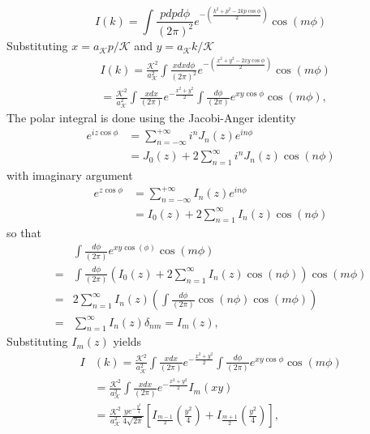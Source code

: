 \documentclass[english,aps,prd,nofootinbib,twocolumn]{revtex4-1}
\begin{document}
\begin{equation}
I(k)=\int \!\! \frac{p dp d\phi }{(2\pi)^2}
e^{-\left( 
\tfrac{k^{2}+p^{2}-2kp \cos \!\phi}{2} 
\right)}
\cos(m\phi)
\end{equation}
Substituting $x=a_{\mathcal{K}}p/\mathcal{K}$ and $y=a_{\mathcal{K}}k/\mathcal{K}$
\begin{equation}
\begin{split}
&I(k)=\frac{\mathcal{K}^{2}}{a_{\mathcal{K}}^{2}}\!\!
\int \!\! \frac{x dx d\phi }{(2\pi)^2}
e^{-\left( 
\tfrac{x^{2}+y^{2}-2xy \cos \!\phi}{2} 
\right)}
\!\! \cos(m\phi) \\ &=
\frac{\mathcal{K}^{2}}{a_{\mathcal{K}}^{2}}\!\!
\int \!\! \frac{x dx}{(2\pi)}
e^{-\tfrac{x^{2}+y^{2}}{2} } \!\!
\int \!\! \frac{d\phi }{(2\pi)}
e^{xy \cos \!\phi} 
\! \cos(m\phi)
,
\end{split}
\end{equation}
The polar integral is done using the Jacobi-Anger identity
\begin{equation}
\begin{split}
e^{iz\cos\phi} \!&= \!\!\!
\sum_{n=-\infty}^{+\infty}i^{n}J_{n}(z)e^{in\phi}
\\&= J_{0}(z) + 
2\sum_{n=1}^{\infty}i^{n}J_{n}(z)\cos(n\phi)
\end{split}
\end{equation}
with imaginary argument 
\begin{equation}
\begin{split}
e^{z\cos\phi}&=\sum_{n=-\infty}^{+\infty}I_{n}(z)e^{in\phi}
\\& = I_{0}(z) + 
2\sum_{n=1}^{\infty}I_{n}(z)\cos(n\phi)
\end{split}
\end{equation}
so that
\begin{equation}
\begin{split}
&
\int \!\! \frac{d\phi }{(2\pi)}
e^{xy \cos(\phi)} 
\! \cos(m\phi)
\\=&
\int \!\! \frac{d\phi }{(2\pi)}
\left(
I_{0}(z) + 
2\sum_{n=1}^{\infty}I_{n}(z)\cos(n\phi)
\right)
\! \cos(m\phi)
\\=&
2\sum_{n=1}^{\infty}I_{n}(z)
\left(
\int \!\! \frac{d\phi }{(2\pi)}
\cos(n\phi)\! \cos(m\phi)
\right)
\\=&
\sum_{n=1}^{\infty}I_{n}(z) \delta_{nm}
= I_{m}(z)
,
\end{split}
\end{equation}
Substituting $I_{m}(z)$ yields
\begin{equation}
\begin{split}
I&(k) =
\frac{\mathcal{K}^{2}}{a_{\mathcal{K}}^{2}}\!\!
\int \!\! \frac{x dx}{(2\pi)}
e^{-\tfrac{x^{2}+y^{2}}{2} } \!\!
\int \!\! \frac{d\phi }{(2\pi)}
e^{xy \cos \!\phi} 
\! \cos(m\phi) 
\\ &=
\frac{\mathcal{K}^{2}}{a_{\mathcal{K}}^{2}}\!\!
\int \!\! \frac{x dx}{(2\pi)}
e^{-\tfrac{x^{2}+y^{2}}{2} } \! I_{m}(xy)
\\ &=
\frac{\mathcal{K}^{2}}{a_{\mathcal{K}}^{2}}
\frac{y e^{-\frac{y^{2}}{4}}}{4\sqrt{2\pi}}
\left[ 
I_{\frac{m-1}{2}}\left(\frac{y^{2}}{4}\right) + 
I_{\frac{m+1}{2}}\left(\frac{y^{2}}{4}\right)
\right]
,
\end{split}
\end{equation}
\end{document}
